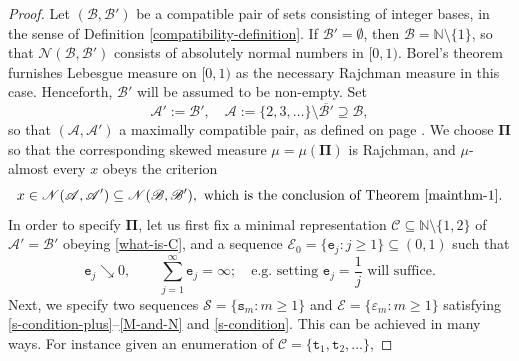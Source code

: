 \documentclass[12pt, twoside]{article}
\theoremstyle{definition}
\numberwithin{equation}{section}
\begin{document}
\begin{proof} 
Let $(\mathscr{B}, \mathscr{B}')$ be a compatible pair of sets consisting of integer bases, in the sense of Definition \ref{compatibility-definition}. If $\mathscr{B}' = \emptyset$, then $\mathscr{B} = \mathbb N \setminus \{1\}$, so that $\mathscr{N}(\mathscr{B}, \mathscr{B}')$ consists of absolutely normal numbers in $[0,1)$. Borel's theorem \cite{b09} furnishes Lebesgue measure on $[0,1)$ as the necessary Rajchman measure in this case. Henceforth, $\mathscr{B}'$ will be assumed to be non-empty. Set 
\[  \mathscr{A}' := \mathscr{B}', \quad \mathscr{A} := \{2, 3, \ldots\} \setminus \overline{\mathscr{B}'} \supseteq \mathscr{B}, \] 
so that $(\mathscr{A}, \mathscr{A}')$ a maximally compatible pair, as defined on page \pageref{compatibility-definition}. We choose $\pmb{\Pi}$ so that the corresponding skewed measure $\mu = \mu(\pmb{\Pi})$ is Rajchman, and $\mu$-almost every $x$ obeys the criterion
\begin{equation} \label{revised-mainthm-1} x \in \mathscr{N}(\mathscr{A}, \mathscr{A}') \subseteq \mathscr{N}(\mathscr{B}, \mathscr{B}'), \text{ which is the conclusion of Theorem \ref{mainthm-1}}. \end{equation} 
\vskip0.1in
\noindent In order to specify $\pmb{\Pi}$, let us first fix a minimal representation $\mathscr{C} \subseteq \mathbb N \setminus \{1, 2\}$ of $\mathscr{A}'= \mathscr{B}'$ obeying \eqref{what-is-C}, and a sequence $\mathcal E_0 = \{\mathtt e_j : j \geq 1\} \subseteq (0, 1)$ such that 
\begin{equation} \label{kappaj}
\mathtt e_j \searrow 0, \qquad \sum_{j=1}^{\infty} \mathtt e_j = \infty; \quad \text{e.g. setting } \mathtt e_j = \frac{1}{j} \text{ will suffice.} 
\end{equation}
Next, we specify two sequences $\mathcal S = \{\mathtt s_m: m \geq 1\}$ and $\mathcal E = \{\varepsilon_m : m \geq 1\}$ satisfying \eqref{s-condition-plus}--\eqref{M-and-N} and \eqref{s-condition}.  
This can be achieved in many ways. For instance given an enumeration of $\mathscr{C} = \{\mathtt t_1, \mathtt t_2, \ldots \}$, 

\end{proof}
\end{document}

